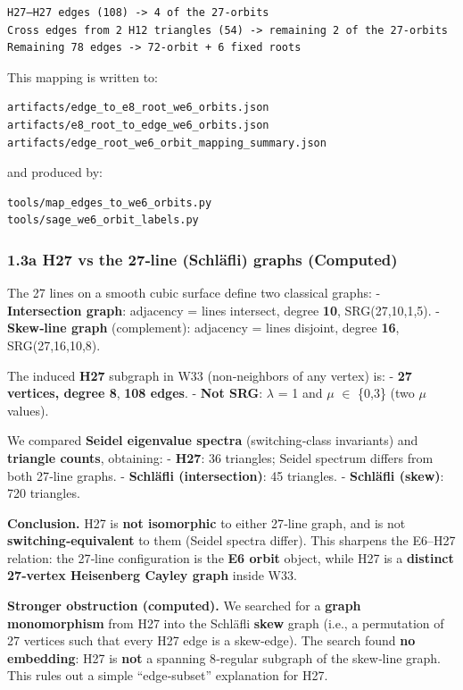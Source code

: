 \documentclass[11pt]{article}
\begin{document}
\begin{verbatim}
H27–H27 edges (108) -> 4 of the 27-orbits
Cross edges from 2 H12 triangles (54) -> remaining 2 of the 27-orbits
Remaining 78 edges -> 72-orbit + 6 fixed roots
\end{verbatim}

This mapping is written to:

\begin{verbatim}
artifacts/edge_to_e8_root_we6_orbits.json
artifacts/e8_root_to_edge_we6_orbits.json
artifacts/edge_root_we6_orbit_mapping_summary.json
\end{verbatim}

and produced by:

\begin{verbatim}
tools/map_edges_to_we6_orbits.py
tools/sage_we6_orbit_labels.py
\end{verbatim}

\subsubsection{1.3a H27 vs the 27‑line (Schläfli) graphs
(Computed)}\label{a-h27-vs-the-27line-schluxe4fli-graphs-computed}

The 27 lines on a smooth cubic surface define two classical graphs: -
\textbf{Intersection graph}: adjacency = lines intersect, degree
\textbf{10}, SRG(27,10,1,5). - \textbf{Skew‑line graph} (complement):
adjacency = lines disjoint, degree \textbf{16}, SRG(27,16,10,8).

The induced \textbf{H27} subgraph in W33 (non‑neighbors of any vertex)
is: - \textbf{27 vertices, degree 8}, \textbf{108 edges}. - \textbf{Not
SRG}: \ensuremath{\lambda} = 1 and \ensuremath{\mu} \ensuremath{\in}
\{0,3\} (two \ensuremath{\mu} values).

We compared \textbf{Seidel eigenvalue spectra} (switching‑class
invariants) and \textbf{triangle counts}, obtaining: - \textbf{H27}: 36
triangles; Seidel spectrum differs from both 27‑line graphs. -
\textbf{Schläfli (intersection)}: 45 triangles. - \textbf{Schläfli
(skew)}: 720 triangles.

\textbf{Conclusion.} H27 is \textbf{not isomorphic} to either 27‑line
graph, and is not \textbf{switching‑equivalent} to them (Seidel spectra
differ). This sharpens the E6--H27 relation: the 27‑line configuration
is the \textbf{E6 orbit} object, while H27 is a \textbf{distinct
27‑vertex Heisenberg Cayley graph} inside W33.

\textbf{Stronger obstruction (computed).} We searched for a
\textbf{graph monomorphism} from H27 into the Schläfli \textbf{skew}
graph (i.e., a permutation of 27 vertices such that every H27 edge is a
skew‑edge). The search found \textbf{no embedding}: H27 is \textbf{not}
a spanning 8‑regular subgraph of the skew‑line graph. This rules out a
simple ``edge‑subset'' explanation for H27.
\end{document}
